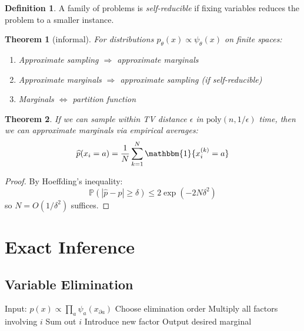 \documentclass[12pt,oneside]{book}
\numberwithin{equation}{section}
\theoremstyle{definition}
\newtheorem{definition}{Definition}[section]
\theoremstyle{plain}
\newtheorem{theorem}{Theorem}[section]
\theoremstyle{remark}
\newcommand{\Prob}{\mathbb{P}}
\newcommand{\ind}{\mathbbm{1}}
\begin{document}
\begin{definition}
A family of problems is \emph{self-reducible} if fixing variables reduces the problem to a smaller instance.
\end{definition}

\begin{theorem}[informal]
For distributions $p_\theta(x) \propto \psi_\theta(x)$ on finite spaces:

\begin{enumerate}
\item Approximate sampling $\Rightarrow$ approximate marginals
\item Approximate marginals $\Rightarrow$ approximate sampling (if self-reducible)
\item Marginals $\Leftrightarrow$ partition function
\end{enumerate}
\end{theorem}


\begin{theorem}
If we can sample within TV distance $\epsilon$ in $\mathrm{poly}(n,1/\epsilon)$ time, then we can approximate marginals via empirical averages:
\[
\widehat{p}(x_i = a) = \frac{1}{N} \sum_{k=1}^N \ind\{x_i^{(k)} = a\}
\]
\end{theorem}

\begin{proof}
By Hoeffding’s inequality:
\[
\Prob\left( |\widehat{p} - p| \ge \delta \right)
\le 2 \exp(-2N\delta^2)
\]
so $N = O(1/\delta^2)$ suffices.
\end{proof}


\section{Exact Inference}

\subsection{Variable Elimination}

\begin{algorithm}
\caption{Variable Elimination}
\begin{algorithmic}
\State Input: $p(x) \propto \prod_a \psi_a(x_{\partial a})$
\State Choose elimination order
    \State Multiply all factors involving $i$
    \State Sum out $i$
    \State Introduce new factor
\EndFor
\State Output desired marginal
\end{algorithmic}
\end{algorithm}
\end{document}
